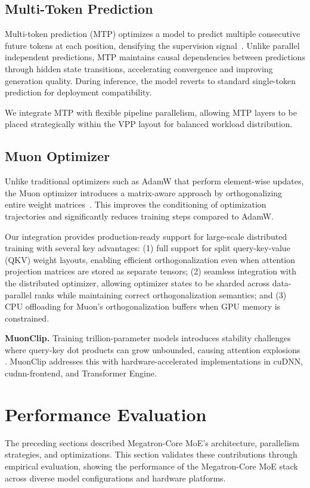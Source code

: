 \documentclass[10pt,logo,copyright]{nvidiatechreport}
\begin{document}
\subsection{Multi-Token Prediction}
Multi-token prediction (MTP) optimizes a model to predict multiple consecutive future tokens at each position, densifying the supervision signal~\cite{gloeckle2024better,deepseekai2025deepseekv3technicalreport}. Unlike parallel independent predictions, MTP maintains causal dependencies between predictions through hidden state transitions, accelerating convergence and improving generation quality. During inference, the model reverts to standard single-token prediction for deployment compatibility.

We integrate MTP with flexible pipeline parallelism, allowing MTP layers to be placed strategically within the VPP layout for balanced workload distribution.

\subsection{Muon Optimizer}
Unlike traditional optimizers such as AdamW that perform element-wise updates, the Muon optimizer introduces a matrix-aware approach by orthogonalizing entire weight matrices~\cite{liu2025muonscalablellmtraining}. This improves the conditioning of optimization trajectories and significantly reduces training steps compared to AdamW.

Our integration provides production-ready support for large-scale distributed training with several key advantages: (1) full support for split query-key-value (QKV) weight layouts, enabling efficient orthogonalization even when attention projection matrices are stored as separate tensors; (2) seamless integration with the distributed optimizer, allowing optimizer states to be sharded across data-parallel ranks while maintaining correct orthogonalization semantics; and (3) CPU offloading for Muon's orthogonalization buffers when GPU memory is constrained.

\textbf{MuonClip.}
Training trillion-parameter models introduces stability challenges where query-key dot products can grow unbounded, causing attention explosions \cite{kimik2}. MuonClip addresses this with hardware-accelerated implementations in cuDNN, cudnn-frontend, and Transformer Engine.

\section{Performance Evaluation}\label{performance-evaluations}
The preceding sections described Megatron-Core MoE's architecture, parallelism strategies, and optimizations. This section validates these contributions through empirical evaluation, showing the performance of the Megatron-Core MoE stack across diverse model configurations and hardware platforms.
\end{document}
